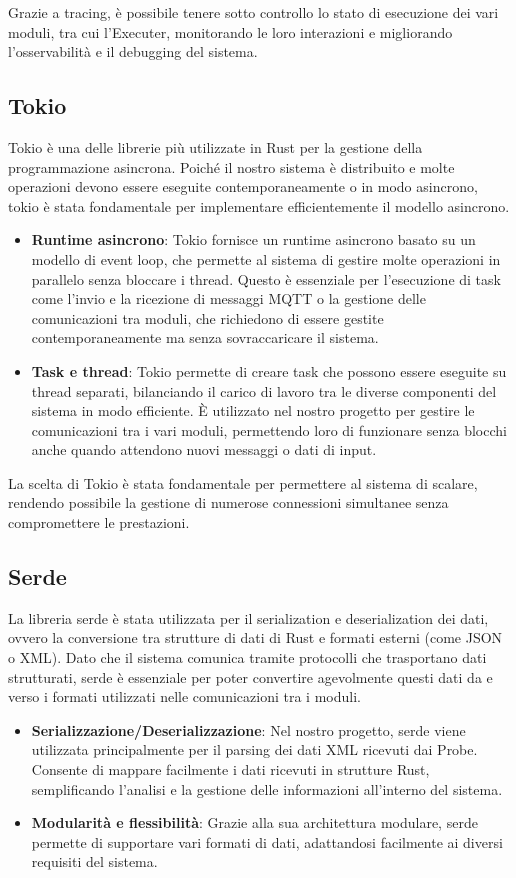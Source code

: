\documentclass[target=bach,aauheader=,style=]{thud}
\begin{document}
Grazie a tracing, è possibile tenere sotto controllo lo stato di esecuzione dei vari moduli, tra cui l'Executer, monitorando le loro interazioni e migliorando l'osservabilità e il debugging del sistema.

\subsection{Tokio}
Tokio \cite{rust_tokio} è una delle librerie più utilizzate in Rust per la gestione della programmazione asincrona. Poiché il nostro sistema è distribuito e molte operazioni devono essere eseguite contemporaneamente o in modo asincrono, tokio è stata fondamentale per implementare efficientemente il modello asincrono.
\begin{itemize}
  \item \textbf{Runtime asincrono}: Tokio fornisce un runtime asincrono basato su un modello di event loop, che permette al sistema di gestire molte operazioni in parallelo senza bloccare i thread. Questo è essenziale per l'esecuzione di task come l'invio e la ricezione di messaggi MQTT o la gestione delle comunicazioni tra moduli, che richiedono di essere gestite contemporaneamente ma senza sovraccaricare il sistema.
  \item \textbf{Task e thread}: Tokio permette di creare task che possono essere eseguite su thread separati, bilanciando il carico di lavoro tra le diverse componenti del sistema in modo efficiente. È utilizzato nel nostro progetto per gestire le comunicazioni tra i vari moduli, permettendo loro di funzionare senza blocchi anche quando attendono nuovi messaggi o dati di input.
\end{itemize}

La scelta di Tokio è stata fondamentale per permettere al sistema di scalare, rendendo possibile la gestione di numerose connessioni simultanee senza compromettere le prestazioni.

\subsection{Serde}
La libreria serde \cite{rust_serde} è stata utilizzata per il serialization e deserialization dei dati, ovvero la conversione tra strutture di dati di Rust e formati esterni (come JSON o XML). Dato che il sistema comunica tramite protocolli che trasportano dati strutturati, serde è essenziale per poter convertire agevolmente questi dati da e verso i formati utilizzati nelle comunicazioni tra i moduli.
\begin{itemize}
  \item \textbf{Serializzazione/Deserializzazione}: Nel nostro progetto, serde viene utilizzata principalmente per il parsing dei dati XML ricevuti dai Probe. Consente di mappare facilmente i dati ricevuti in strutture Rust, semplificando l'analisi e la gestione delle informazioni all'interno del sistema.
  \item \textbf{Modularità e flessibilità}: Grazie alla sua architettura modulare, serde permette di supportare vari formati di dati, adattandosi facilmente ai diversi requisiti del sistema.
\end{itemize}
\end{document}
